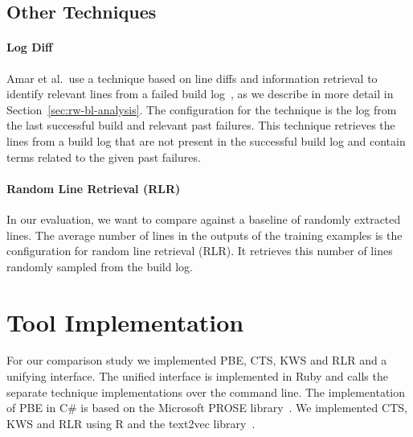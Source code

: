 \documentclass[\myrootdir/main.tex]{subfiles}
\begin{document}
\subsection{Other Techniques}
\label{sec:expl-rlr}

\paragraph{Log Diff}
Amar et al.\ use a technique based on line diffs and information retrieval to identify relevant lines from a failed build log~\cite{amar2019mining}, as we describe in more detail in Section~\ref{sec:rw-bl-analysis}.
The configuration for the technique is the log from the last successful build and relevant past failures.
This technique retrieves the lines from a build log that are not present in the successful build log and contain terms related to the given past failures.

\paragraph{Random Line Retrieval (RLR)}
In our evaluation, we want to compare against a baseline of randomly extracted lines.
The average number of lines in the outputs of the training examples is the configuration for random line retrieval (RLR).
It retrieves this number of lines randomly sampled from the build log.

\section{Tool Implementation}
For our comparison study we implemented PBE, CTS, KWS and RLR and a unifying interface.
The unified interface is implemented in Ruby and calls the separate technique implementations over the command line.
The implementation of PBE in C\# is based on the Microsoft PROSE library~\cite{prose2019webpage}.
We implemented CTS, KWS and RLR using R and the text2vec library~\cite{text2vec2019webpage}.
\end{document}
